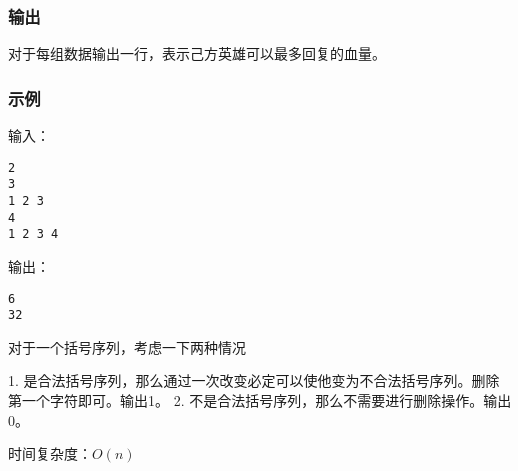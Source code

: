 \subsubsection{输出}
对于每组数据输出一行，表示己方英雄可以最多回复的血量。

\subsubsection{示例}
输入：
\begin{lstlisting}
2
3
1 2 3
4
1 2 3 4
\end{lstlisting}

输出：
\begin{lstlisting}
6
32
\end{lstlisting}

对于一个括号序列，考虑一下两种情况

1. 是合法括号序列，那么通过一次改变必定可以使他变为不合法括号序列。删除第一个字符即可。输出1。
2. 不是合法括号序列，那么不需要进行删除操作。输出0。

时间复杂度：$O(n)$
